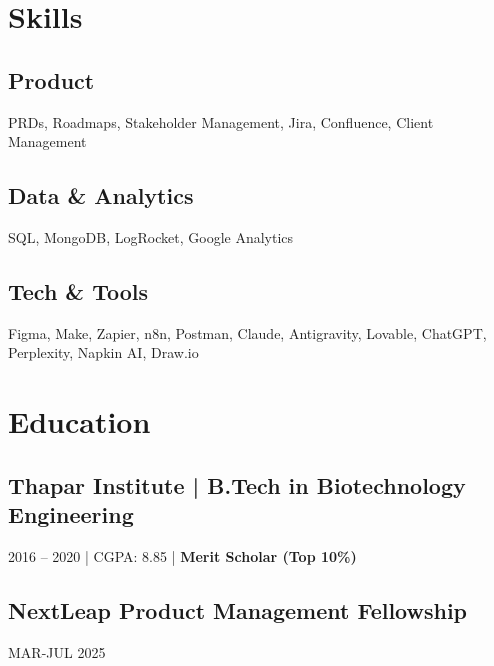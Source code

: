 \documentclass[]{plushcv}
\begin{document}
\hfill
\begin{minipage}[t]{0.25\textwidth}


\section{Skills}

\subsection{Product}
PRDs, Roadmaps, Stakeholder Management, Jira, Confluence, Client Management

\sectionsep
\medskip

\subsection{Data \& Analytics}
SQL, MongoDB, LogRocket, Google Analytics

\sectionsep
\medskip

\subsection{Tech \& Tools}
Figma, Make, Zapier, n8n, Postman, Claude, Antigravity, Lovable, ChatGPT, Perplexity, Napkin AI, Draw.io


\section{Education}

\subsection{Thapar Institute | B.Tech in Biotechnology Engineering}
2016 – 2020 | CGPA: 8.85 | \textbf{Merit Scholar (Top 10\%)}

\sectionsep
\medskip

\subsection{NextLeap Product Management Fellowship}
MAR-JUL 2025
\newline{}


\end{minipage}
\end{document}
